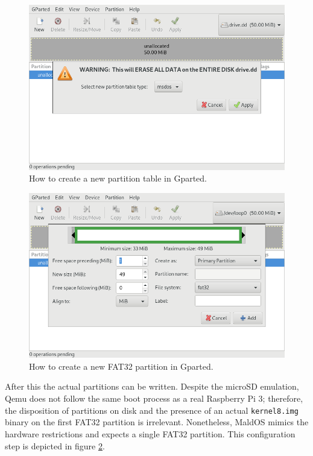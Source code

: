 \documentclass[12pt,a4paper,openright,twoside]{report}
\begin{document}
 \begin{figure}[t]
    \begin{center}
 \includegraphics[scale=0.3]{images/tesi18.png}
 \caption[Gparted Partition Table]{ How to create a new partition table in Gparted.}
 \label{fig:gparted1}
    \end{center}
 \end{figure}

 \begin{figure}[h]
    \begin{center}
 \includegraphics[scale=0.3]{images/tesi19.png}
 \caption[Gparted FAT32 Partition]{ How to create a new FAT32 partition in Gparted.}
 \label{fig:gparted2}
    \end{center}
 \end{figure}


After this the actual partitions can be written. Despite the microSD emulation, Qemu
does not follow the same boot process as a real Raspberry Pi 3; therefore, the 
disposition of partitions on disk and the presence of an actual {\tt kernel8.img}
binary on the first FAT32 partition is irrelevant. Nonetheless, MaldOS mimics the hardware 
restrictions and expects a single FAT32 partition. This configuration
step is depicted in figure \ref{fig:gparted2}.
\end{document}
